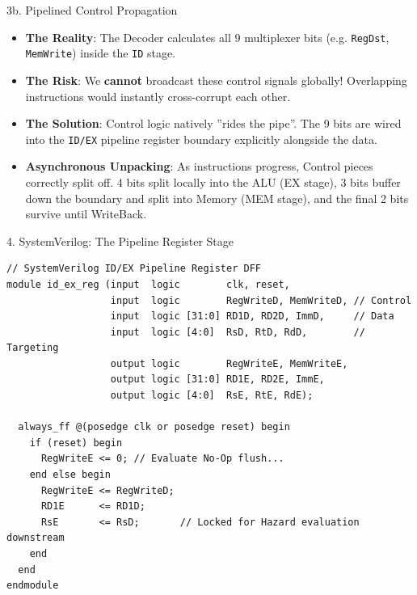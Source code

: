 \documentclass[aspectratio=169]{beamer}
\begin{document}
\begin{frame}{3b. Pipelined Control Propagation}
\begin{itemize}
    \item \textbf{The Reality}: The Decoder calculates all 9 multiplexer bits (e.g. \texttt{RegDst}, \texttt{MemWrite}) inside the \texttt{ID} stage.
    \item \textbf{The Risk}: We \textbf{cannot} broadcast these control signals globally! Overlapping instructions would instantly cross-corrupt each other.
    \item \textbf{The Solution}: Control logic natively ''rides the pipe''. The 9 bits are wired into the \texttt{ID/EX} pipeline register boundary explicitly alongside the data.
    \item \textbf{Asynchronous Unpacking}: As instructions progress, Control pieces correctly split off. 4 bits split locally into the ALU (EX stage), 3 bits buffer down the boundary and split into Memory (MEM stage), and the final 2 bits survive until WriteBack.
\end{itemize}
\end{frame}

\begin{frame}[fragile]{4. SystemVerilog: The Pipeline Register Stage}
\begin{verbatim}
// SystemVerilog ID/EX Pipeline Register DFF
module id_ex_reg (input  logic        clk, reset,
                  input  logic        RegWriteD, MemWriteD, // Control
                  input  logic [31:0] RD1D, RD2D, ImmD,     // Data
                  input  logic [4:0]  RsD, RtD, RdD,        // Targeting
                  output logic        RegWriteE, MemWriteE, 
                  output logic [31:0] RD1E, RD2E, ImmE,
                  output logic [4:0]  RsE, RtE, RdE);

  always_ff @(posedge clk or posedge reset) begin
    if (reset) begin
      RegWriteE <= 0; // Evaluate No-Op flush...
    end else begin
      RegWriteE <= RegWriteD;
      RD1E      <= RD1D;
      RsE       <= RsD;       // Locked for Hazard evaluation downstream
    end
  end
endmodule
\end{verbatim}
\end{frame}
\end{document}
